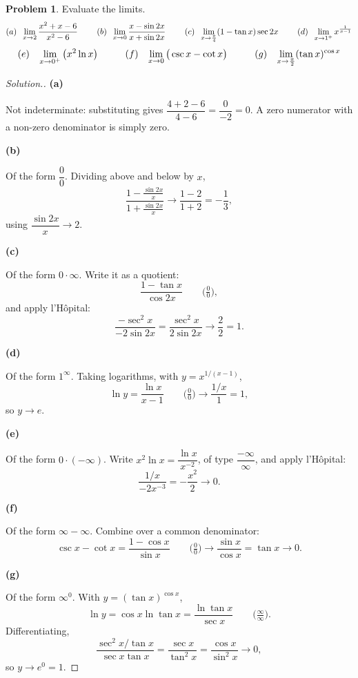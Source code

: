 \documentclass[11pt,a4paper]{article}
\theoremstyle{definition}
\newtheorem{problemx}{Problem}[subsection]
\newenvironment{problem}{\begin{problemx}}{\end{problemx}}
\newenvironment{solution}
  {\renewcommand{\qedsymbol}{}\begin{proof}[\textit{Solution}.]}
  {\end{proof}}
\newcommand{\subhead}[1]{%
  \par\medskip\noindent\textbf{#1}\par\nobreak\smallskip}
\begin{document}
\begin{problem}
Evaluate the limits.
$$(a)\hspace{0.2cm}\lim_{x\rightarrow 2}\frac{x^2+x-6}{x^2-6}
\hspace{0.8cm}(b)\hspace{0.2cm}\lim_{x\rightarrow 0}\frac{x-\sin 2x}{x+\sin 2x}
\hspace{0.8cm}(c)\hspace{0.2cm}\lim_{x\rightarrow\frac{\pi}{4}}(1-\tan x)\sec 2x
\hspace{0.8cm}(d)\hspace{0.2cm}\lim_{x\rightarrow 1^+}x^{\frac{1}{x-1}}$$
$$(e)\hspace{0.3cm}\lim_{x\rightarrow 0^+}\big(x^2\ln x\big)
\hspace{1cm}(f)\hspace{0.3cm}\lim_{x\rightarrow 0}\big(\csc x - \cot x\big)
\hspace{1cm}(g)\hspace{0.3cm}\lim_{x\rightarrow\frac{\pi}{2}}(\tan x)^{\cos x}$$
\end{problem}
\begin{solution}
\subhead{(a)}
Not indeterminate: substituting gives $\dfrac{4+2-6}{4-6} = \dfrac{0}{-2} = 0$.
A zero numerator with a non-zero denominator is simply zero.

\subhead{(b)}
Of the form $\dfrac{0}{0}$. Dividing above and below by $x$,
$$\frac{1 - \frac{\sin 2x}{x}}{1 + \frac{\sin 2x}{x}}
\longrightarrow \frac{1-2}{1+2} = -\frac{1}{3},$$
using $\dfrac{\sin 2x}{x}\rightarrow 2$.

\subhead{(c)}
Of the form $0\cdot\infty$. Write it as a quotient:
$$\frac{1-\tan x}{\cos 2x} \qquad\Big(\tfrac00\Big),$$
and apply l'H\^{o}pital:
$$\frac{-\sec^2x}{-2\sin 2x} = \frac{\sec^2 x}{2\sin 2x}
\longrightarrow \frac{2}{2} = 1 .$$

\subhead{(d)}
Of the form $1^{\infty}$. Taking logarithms, with $y = x^{1/(x-1)}$,
$$\ln y = \frac{\ln x}{x-1} \qquad\Big(\tfrac00\Big)
\longrightarrow \frac{1/x}{1} = 1 ,$$
so $y\rightarrow e$.

\subhead{(e)}
Of the form $0\cdot(-\infty)$. Write $x^2\ln x = \dfrac{\ln x}{x^{-2}}$, of type
$\dfrac{-\infty}{\infty}$, and apply l'H\^{o}pital:
$$\frac{1/x}{-2x^{-3}} = -\frac{x^2}{2}\longrightarrow 0 .$$

\subhead{(f)}
Of the form $\infty-\infty$. Combine over a common denominator:
$$\csc x - \cot x = \frac{1-\cos x}{\sin x} \qquad\Big(\tfrac00\Big)
\longrightarrow \frac{\sin x}{\cos x} = \tan x \longrightarrow 0 .$$

\subhead{(g)}
Of the form $\infty^0$. With $y = (\tan x)^{\cos x}$,
$$\ln y = \cos x\ln\tan x = \frac{\ln\tan x}{\sec x}
\qquad\Big(\tfrac{\infty}{\infty}\Big).$$
Differentiating,
$$\frac{\sec^2x/\tan x}{\sec x\tan x}
= \frac{\sec x}{\tan^2 x} = \frac{\cos x}{\sin^2 x}\longrightarrow 0 ,$$
so $y\rightarrow e^0 = 1$.
\end{solution}
\end{document}
